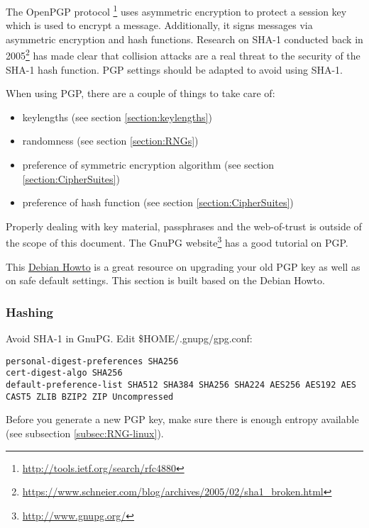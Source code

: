 The OpenPGP protocol
\footnote{\url{http://tools.ietf.org/search/rfc4880}}
 uses asymmetric encryption to protect a session key which is used to encrypt a message. Additionally, it signs messages via asymmetric encryption and hash functions. %
Research on SHA-1 conducted back in 2005\footnote{\url{https://www.schneier.com/blog/archives/2005/02/sha1\_broken.html}} has made clear that collision attacks are a real threat to the security of the SHA-1 hash function. PGP settings should be adapted to avoid using SHA-1.


When using PGP, there are a couple of things to take care of:
\begin{itemize}
\item keylengths (see section \ref{section:keylengths})
\item randomness (see section \ref{section:RNGs})
\item preference of symmetric encryption algorithm (see section \ref{section:CipherSuites})
\item preference of hash function (see section \ref{section:CipherSuites})
\end{itemize}

Properly dealing with key material, passphrases and the web-of-trust is outside of the scope of this document. The GnuPG website\footnote{\url{http://www.gnupg.org/}} has a good tutorial on PGP.

This \href{https://www.debian-administration.org/users/dkg/weblog/48}{Debian Howto} is a great resource on upgrading your old PGP key as well as on safe default settings. This section is built based on the Debian Howto.

\subsubsection{Hashing}
Avoid SHA-1 in GnuPG. Edit \$HOME/.gnupg/gpg.conf:

\begin{lstlisting}[breaklines]
personal-digest-preferences SHA256
cert-digest-algo SHA256
default-preference-list SHA512 SHA384 SHA256 SHA224 AES256 AES192 AES CAST5 ZLIB BZIP2 ZIP Uncompressed
\end{lstlisting}

Before you generate a new PGP key, make sure there is enough entropy available (see subsection \ref{subsec:RNG-linux}).


